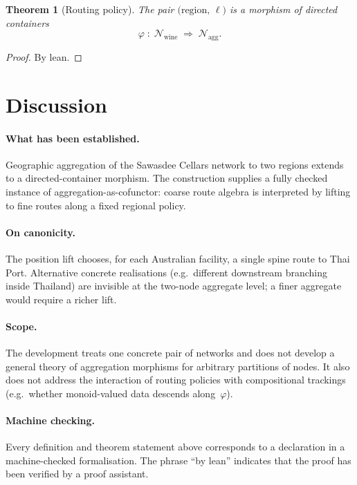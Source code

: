 \documentclass[11pt,a4paper]{article}
\theoremstyle{plain}
\newtheorem{theorem}{Theorem}[section]
\theoremstyle{definition}
\begin{document}
\begin{theorem}[Routing policy]\label{thm:routing-policy}
The pair $\bigl(\mathrm{region},\, \ell\bigr)$ is a morphism of directed
containers
\begin{equation}
  \varphi \;:\;
  \mathcal{N}_{\mathrm{wine}}
  \;\Longrightarrow\;
  \mathcal{N}_{\mathrm{agg}}.
\end{equation}
\end{theorem}

\begin{proof}
By lean.
\end{proof}

\section{Discussion}

\paragraph{What has been established.}
Geographic aggregation of the Sawasdee Cellars network to two regions extends
to a directed-container morphism. The construction supplies a fully checked
instance of aggregation-as-cofunctor: coarse route algebra is interpreted by
lifting to fine routes along a fixed regional policy.

\paragraph{On canonicity.}
The position lift chooses, for each Australian facility, a single spine route
to Thai Port. Alternative concrete realisations (e.g.\ different downstream
branching inside Thailand) are invisible at the two-node aggregate level; a
finer aggregate would require a richer lift.

\paragraph{Scope.}
The development treats one concrete pair of networks and does not develop a
general theory of aggregation morphisms for arbitrary partitions of nodes. It
also does not address the interaction of routing policies with compositional
trackings (e.g.\ whether monoid-valued data descends along~$\varphi$).

\paragraph{Machine checking.}
Every definition and theorem statement above corresponds to a declaration in a
machine-checked formalisation. The phrase ``by lean'' indicates that the proof
has been verified by a proof assistant.
\end{document}
